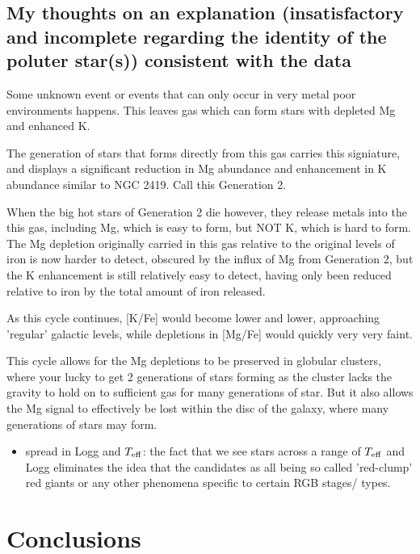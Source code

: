 \documentclass[a4paper,fleqn,usenatbib]{mnras}
\newcommand{\teff}{T_{\rm eff}}
\begin{document}
\subsection{My thoughts on an explanation (insatisfactory and incomplete regarding the identity of the poluter star(s)) consistent with the data}

Some unknown event or events that can only occur in very metal poor environments happens. This leaves gas which can form stars with depleted Mg and enhanced K.

The generation of stars that forms directly from this gas carries this signiature, and displays a significant reduction in Mg abundance and enhancement in K abundance similar to NGC 2419. Call this Generation 2.

When the big hot stars of Generation 2 die however, they release metals into the this gas, including Mg, which is easy to form, but NOT K, which is hard to form. The Mg depletion originally carried in this gas relative to the original levels of iron is now harder to detect, obscured by the influx of Mg from Generation 2, but the K enhancement is still relatively easy to detect, having only been reduced relative to iron by the total amount of iron released.

As this cycle continues, [K/Fe] would become lower and lower, approaching 'regular' galactic levels, while depletions in [Mg/Fe] would quickly very very faint.

This cycle allows for the Mg depletions to be preserved in globular clusters, where your lucky to get 2 generations of stars forming as the cluster lacks the gravity to hold on to sufficient gas for many generations of star. But it also allows the Mg signal to effectively be lost within the disc of the galaxy, where many generations of stars may form.



\begin{itemize}


\item spread in Logg and $\teff$: the fact that we see stars across a range of $\teff$ and Logg eliminates the idea that the candidates as all being so called 'red-clump' red giants or any other phenomena specific to certain RGB stages/ types. 



\end{itemize}

\section{Conclusions}
\end{document}
